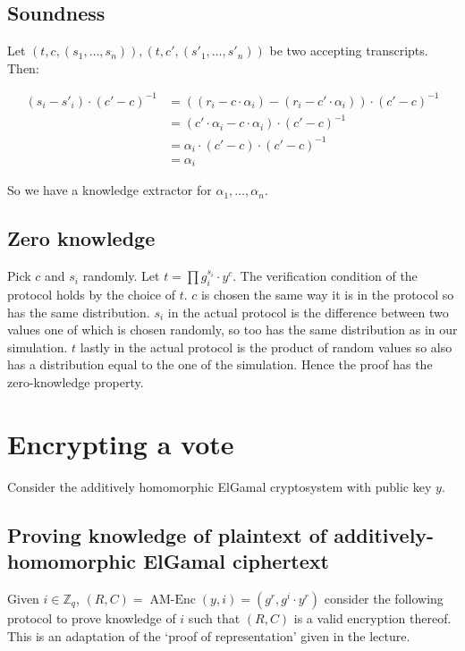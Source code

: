 \documentclass[a4paper]{scrreprt}
\begin{document}
\subsection{Soundness}

Let $(t, c, (s_1, \ldots, s_n)), (t, c', (s'_1, \ldots, s'_n))$ be two accepting
transcripts. Then:

\begin{align*}
		(s_i - s'_i) \cdot (c' - c)^{-1} & = ((r_i - c \cdot \alpha_i) - (r_i - c' \cdot \alpha_i)) \cdot (c' - c)^{-1} \\
										 & = (c' \cdot \alpha_i - c \cdot \alpha_i) \cdot (c' - c)^{-1} \\
										 & = \alpha_i \cdot (c' - c) \cdot (c' - c)^{-1} \\
										 & = \alpha_i
\end{align*}

So we have a knowledge extractor for $\alpha_1, \ldots, \alpha_n$.

\subsection{Zero knowledge}

Pick $c$ and $s_i$ randomly. Let $t = \prod g_i^{s_i} \cdot y^c$. The
verification condition of the protocol holds by the choice of $t$. $c$ is
chosen the same way it is in the protocol so has the same distribution. $s_i$
in the actual protocol is the difference between two values one of which is
chosen randomly, so too has the same distribution as in our simulation. $t$
lastly in the actual protocol is the product of random values so also has a
distribution equal to the one of the simulation. Hence the proof has the
zero-knowledge property.

\section{Encrypting a vote}

Consider the additively homomorphic ElGamal cryptosystem with public key $y$.

\subsection{Proving knowledge of plaintext of additively-homomorphic ElGamal ciphertext}

Given $i \in \mathbb{Z}_q$, $(R, C) = \operatorname{AM-Enc}(y, i) = (g^r, g^i
\cdot y^r)$ consider the following protocol to prove knowledge of $i$ such that
$(R, C)$ is a valid encryption thereof. This is an adaptation of the `proof of
representation' given in the lecture.
\end{document}
